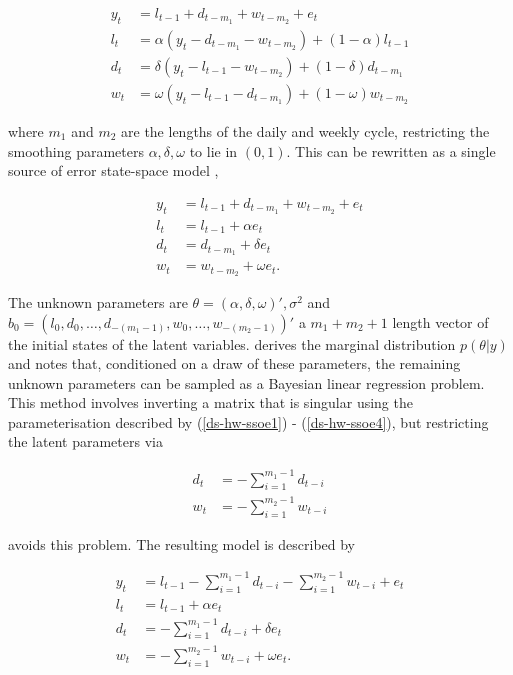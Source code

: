 \documentclass[12pt,a4paper]{article}%
\numberwithin{equation}{section}
\begin{document}
\begin{align}
y_t &= l_{t-1} + d_{t-m_1} + w_{t-m_2} + e_t \label{ds-hw1} \\
l_t &= \alpha (y_t - d_{t-m_1} - w_{t-m_2}) + (1 - \alpha)l_{t-1} \label{ds-hw2}\\
d_t &= \delta (y_t - l_{t-1} - w_{t-m_2}) + (1 - \delta)d_{t-m_1} \label{ds-hw3} \\
w_t &= \omega (y_t - l_{t-1} - d_{t-m_1}) + (1 - \omega)w_{t-m_2} \label{ds-hw4}
\end{align}

where $m_1$ and $m_2$ are the lengths of the daily and weekly cycle, restricting the smoothing parameters $\alpha, \delta, \omega$ to lie in $(0, 1)$. This can be rewritten as a single source of error state-space model \citep{Snyder1985},

\begin{align}
y_t &= l_{t-1} + d_{t-m_1} + w_{t-m_2} + e_t \label{ds-hw-ssoe1} \\
l_t &= l_{t-1} + \alpha e_t \label{ds-hw-ssoe2} \\
d_t &= d_{t-m_1} + \delta e_t \label{ds-hw-ssoe3} \\
w_t &= w_{t-m_2} + \omega e_t \label{ds-hw-ssoe4}. 
\end{align}

The unknown parameters are $\theta = (\alpha, \delta, \omega)', \sigma^2$ and $b_0 = (l_0, d_0, \dots, d_{-(m_1 - 1)}, w_0, \dots, w_{-(m_2 - 1)})'$ a $m_1 + m_2 + 1$ length vector of the initial states of the latent variables. 
\citet{Forbes2000} derives the marginal distribution $p(\theta | y)$ and notes that, conditioned on a draw of these parameters, the remaining unknown parameters can be sampled as a Bayesian linear regression problem. This method involves inverting a matrix that is singular using the parameterisation described by (\ref{ds-hw-ssoe1}) - (\ref{ds-hw-ssoe4}), but restricting the latent parameters via

\begin{align}
d_t &= - \sum_{i=1}^{m_1-1} d_{t-i} \\
w_t &= - \sum_{i=1}^{m_2-1} w_{t-i}
\end{align}

avoids this problem. The resulting model is described by

\begin{align}
y_t &= l_{t-1} - \sum_{i = 1}^{m_1 - 1}d_{t-i} - \sum_{i = 1}^{m_2 - 1}w_{t-i} + e_t \label{ds-hw-rp1} \\
l_t &= l_{t-1} + \alpha e_t \label{ds-hw-rp2} \\
d_t &= - \sum_{i = 1}^{m_1 - 1}d_{t-i} + \delta e_t \label{ds-hw-rp3} \\
w_t &= - \sum_{i = 1}^{m_2 - 1}w_{t-i} + \omega e_t \label{ds-hw-rp4}.
\end{align}
\end{document}
